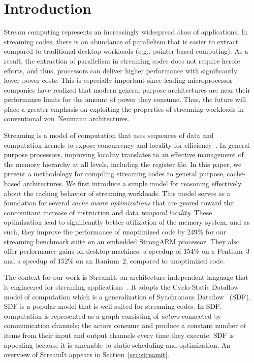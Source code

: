 \section{Introduction}

Stream computing represents an increasingly widespread class of
applications. In streaming codes, there is an abundance of parallelism that
is easier to extract compared to traditional desktop workloads (e.g.,
pointer-based computing). As a result, the extraction of parallelism
in streaming codes does not require heroic efforts, and thus,
processors can deliver higher performance with significantly lower
power costs. This is especially important since
leading microprocessor companies have realized that modern general
purpose architectures are near their  performance limits for  the
amount of power they consume. Thus, the future will place a greater
emphasis on exploiting the properties of streaming workloads in
conventional von~Neumann architectures.

Streaming is a model of computation that uses sequences of data
and computation kernels to expose concurrency and locality for
efficiency~\cite{wss}. In general purpose processors, improving locality 
translates to an effective management of the memory hierarchy at all
levels, including the register file. In this paper, we present a
methodology for compiling streaming codes to general purpose,
cache-based architectures. We first introduce a simple model for
reasoning effectively about the caching behavior of streaming
workloads. This model serves as a foundation for several {\it cache aware
optimizations} that are geared toward the concomitant increase of instruction
and data {\it temporal locality}. These
optimization lead to significantly better utilization of the memory
system, and as such, they improve the performance of unoptimized code
by 249\% for our streaming benchmark suite on an embedded StrongARM 
processor.   They also offer performance gains on desktop machines:  
a speedup of 154\% on a Pentium~3 and a speedup of 152\% on an Itanium~2,
compared to unoptimized code.


The context for our work is StreamIt, an architecture independent
language that is engineered for streaming
applications~\cite{streamitcc}. It adopts the 
Cyclo-Static Dataflow~\cite{BELP96} model of computation which is a
generalization of Synchronous Dataflow~\cite{LM87-i} (SDF).  
SDF is a popular  model that  is well suited for
streaming codes. In SDF, computation is represented as a graph
consisting of {\it  actors} connected by communication channels; the
actors consume  and produce a constant number  of items from their
input and output  channels every time they execute. SDF is appealing
because it is amenable to static scheduling and
optimization. An overview of StreamIt appears in Section~\ref{sec:streamit}.

